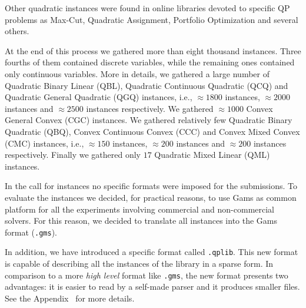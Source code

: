 Other quadratic instances were found in online libraries devoted to
specific QP problems as
Max-Cut, Quadratic Assignment, Portfolio Optimization and several
others.

At the end of this process we gathered more than eight thousand
instances. Three fourths of them contained discrete variables, while
the remaining ones contained only continuous variables.
%
More in details, we gathered a large number of Quadratic Binary Linear
(QBL), Quadratic Continuous Quadratic (QCQ) and Quadratic General
Quadratic (QGQ) instances, i.e., $\approx 1800$ instances, $\approx
2000$ instances and $\approx 2500$ instances respectively.
We gathered $\approx 1000$ Convex General Convex (CGC) instances. We
gathered relatively few Quadratic Binary Quadratic (QBQ), Convex
Continuous Convex (CCC) and Convex Mixed Convex (CMC) instances, i.e.,
$\approx 150$ instances, $\approx 200$ instances and $\approx 200$
instances respectively. Finally we gathered only $17$ Quadratic Mixed
Linear (QML) instances.

In the call for instances no specific formats were imposed
for the submissions.
To evaluate the instances we decided, for practical reasons, to use
Gams as common platform for all the experiments involving commercial and non-commercial
solvers.
For this reason, we decided to translate all instances into the
Gams format (\texttt{.gms}). 

In addition, we have introduced
a specific format called \texttt{.qplib}. This new format is capable of describing
all the instances of the library in a sparse form.
In comparison to a more \emph{high level} format like \texttt{.gms}, the new
format presents two advantages:
it is easier to read by a self-made parser and it produces smaller files.
See the Appendix~\label{sec:format} for more details.


